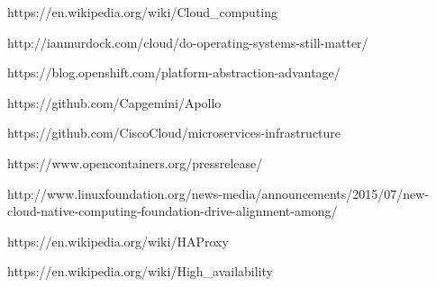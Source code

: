 \begin{thebibliography}{999}

%
%

https://en.wikipedia.org/wiki/Cloud\_computing

%
%

http://ianmurdock.com/cloud/do-operating-systems-still-matter/

https://blog.openshift.com/platform-abstraction-advantage/

https://github.com/Capgemini/Apollo

https://github.com/CiscoCloud/microservices-infrastructure

%
%

https://www.opencontainers.org/pressrelease/

%
%

http://www.linuxfoundation.org/news-media/announcements/2015/07/new-cloud-native-computing-foundation-drive-alignment-among/

%
%

https://en.wikipedia.org/wiki/HAProxy

%
%


%
%

https://en.wikipedia.org/wiki/High\_availability

\end{thebibliography}